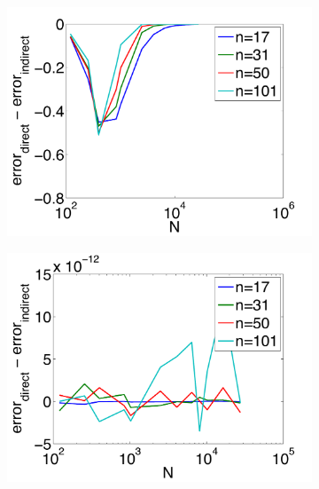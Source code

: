 \begin{figure}[htbp]
	\centering
	\begin{subfigure}[b]{0.425\textwidth}
	\includegraphics[width=1.0\textwidth]{figures/chapter2/compare_weight_generation/lsfc_vs_px_grad_dot_px_grad/diff_of_rel_l2_errors.pdf}
	\end{subfigure}
	\begin{subfigure}[b]{0.425\textwidth}
	\includegraphics[width=1.0\textwidth]{figures/chapter2/compare_weight_generation/xsfc_vs_xsfc_alt_on_sph32/diff_of_rel_l2_errors.pdf}
	\end{subfigure}
	\begin{subfigure}[b]{0.425\textwidth}

\end{subfigure}
\end{figure}
